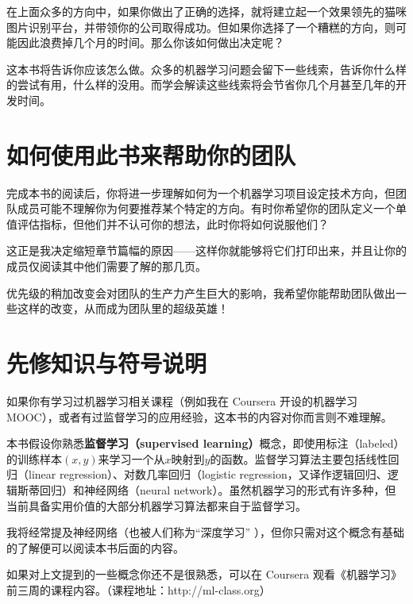 在上面众多的方向中，如果你做出了正确的选择，就将建立起一个效果领先的猫咪图片识别平台，并带领你的公司取得成功。但如果你选择了一个糟糕的方向，则可能因此浪费掉几个月的时间。那么你该如何做出决定呢？

这本书将告诉你应该怎么做。众多的机器学习问题会留下一些线索，告诉你什么样的尝试有用，什么样的没用。而学会解读这些线索将会节省你几个月甚至几年的开发时间。

\hypertarget{ux5982ux4f55ux4f7fux7528ux6b64ux4e66ux6765ux5e2eux52a9ux4f60ux7684ux56e2ux961f}{%
\chapter{如何使用此书来帮助你的团队}\label{ux5982ux4f55ux4f7fux7528ux6b64ux4e66ux6765ux5e2eux52a9ux4f60ux7684ux56e2ux961f}}

完成本书的阅读后，你将进一步理解如何为一个机器学习项目设定技术方向，但团队成员可能不理解你为何要推荐某个特定的方向。有时你希望你的团队定义一个单值评估指标，但他们并不认可你的想法，此时你将如何说服他们？

这正是我决定缩短章节篇幅的原因------这样你就能够将它们打印出来，并且让你的成员仅阅读其中他们需要了解的那几页。

优先级的稍加改变会对团队的生产力产生巨大的影响，我希望你能帮助团队做出一些这样的改变，从而成为团队里的超级英雄！

\hypertarget{ux5148ux4feeux77e5ux8bc6ux4e0eux7b26ux53f7ux8bf4ux660e}{%
\chapter{先修知识与符号说明}\label{ux5148ux4feeux77e5ux8bc6ux4e0eux7b26ux53f7ux8bf4ux660e}}

如果你有学习过机器学习相关课程（例如我在 Coursera 开设的机器学习
MOOC），或者有过监督学习的应用经验，这本书的内容对你而言则不难理解。

本书假设你熟悉\textbf{监督学习（supervised
learning）}概念，即使用标注（labeled）的训练样本\((x,y)\)来学习一个从\(x\)映射到\(y\)的函数。监督学习算法主要包括线性回归（linear
regression）、对数几率回归（logistic
regression，又译作逻辑回归、逻辑斯蒂回归）和神经网络（neural
network）。虽然机器学习的形式有许多种，但当前具备实用价值的大部分机器学习算法都来自于监督学习。

我将经常提及神经网络（也被人们称为``深度学习''
），但你只需对这个概念有基础的了解便可以阅读本书后面的内容。

如果对上文提到的一些概念你还不是很熟悉，可以在 Coursera
观看《机器学习》前三周的课程内容。（课程地址：http://ml-class.org）

